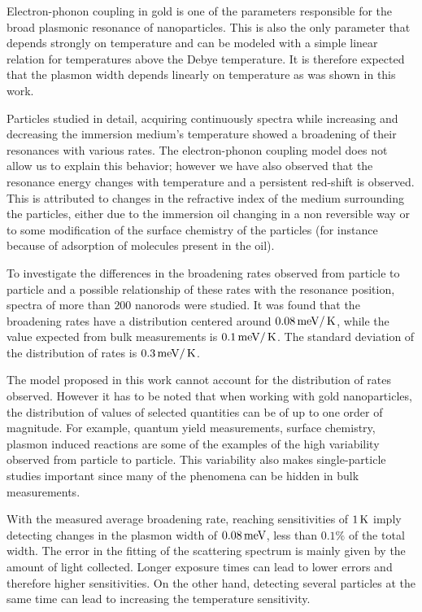 Electron-phonon coupling in gold is one of the parameters responsible for
the broad plasmonic resonance of nanoparticles. This is also the only
parameter that depends strongly on temperature and can be modeled with a
simple linear relation for temperatures above the Debye temperature. It is
therefore expected that the plasmon width depends linearly on temperature as was
shown in this work. 

Particles studied in detail, acquiring continuously spectra while increasing and
decreasing the immersion medium's temperature showed a broadening of their
resonances with various rates. The electron-phonon coupling model does not allow
us to explain this behavior; however we have also observed that the resonance
energy changes with temperature and a persistent red-shift is observed. This is
attributed to changes in the refractive index of the medium surrounding the
particles, either due to the immersion oil changing in a non reversible way or
to some modification of the surface chemistry of the particles (for instance
because of adsorption of molecules present in the oil).

To investigate the differences in the broadening rates observed from particle to
particle and a possible relationship of these rates with the resonance position,
spectra of more than $200$ nanorods were studied. It was found that the
broadening rates have a distribution centered around $0.08\,\textrm{meV}/\,\textrm{K}$, while the
value expected from bulk measurements is $0.1\,\textrm{meV}/\,\textrm{K}$\cite{McKay1976}. The
standard deviation of the distribution of rates is $0.3\,\textrm{meV}/\,\textrm{K}$.

The model proposed in this work cannot account for the distribution of rates
observed. However it has to be noted that when working with gold nanoparticles,
the distribution of values of selected quantities can be of up to one order of
magnitude. For example, quantum yield measurements\cite{Yorulmaz2012}, surface
chemistry\cite{Carattino2016}, plasmon induced reactions\cite{Osinkina2013} are
some of the examples of the high variability observed from particle to particle.
This variability also makes single-particle studies important since many of the
phenomena can be hidden in bulk measurements\cite{Link1999b}.

With the measured average broadening rate, reaching sensitivities of $1\,\textrm{K}$ imply
detecting changes in the plasmon width of $0.08\,\textrm{meV}$, less than $0.1\%$ of the
total width. The error in the fitting of the scattering spectrum is mainly given
by the amount of light collected. Longer exposure times can lead to lower errors
and therefore higher sensitivities. On the other hand, detecting several
particles at the same time can lead to increasing the temperature sensitivity.

